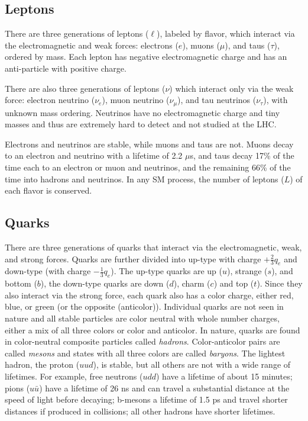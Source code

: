 \subsection{Leptons}
There are three generations of leptons ($\ell$), labeled by flavor, which interact via the electromagnetic and weak forces: electrons ($e$), muons ($\mu$), and taus ($\tau$), ordered by mass. Each lepton has negative electromagnetic charge and has an anti-particle with positive charge. 

There are also three generations of leptons ($\nu$) which interact only via the weak force: electron neutrino ($\nu_{e}$), muon neutrino ($\nu_{\mu}$), and tau neutrinos ($\nu_{\tau}$), with unknown mass ordering. Neutrinos have no electromagnetic charge and tiny masses and thus are extremely hard to detect and not studied at the \ac{LHC}. 

Electrons and neutrinos are stable, while muons and taus are not. Muons decay to an electron and neutrino with a lifetime of 2.2 $\mu$s, and taus decay 17\% of the time each to an electron or muon and neutrinos, and the remaining 66\% of the time into hadrons and neutrinos. In any \ac{SM} process, the number of leptons ($L$) of each flavor is conserved. 


\subsection{Quarks}
There are three generations of quarks that interact via the electromagnetic, weak, and strong forces. Quarks are further divided into up-type with charge $+\frac{2}{3}q_{e}$ and down-type (with charge $-\frac{1}{3}q_{e}$). The up-type quarks are up ($u$), strange ($s$), and bottom ($b$), the down-type quarks are down ($d$), charm ($c$) and top ($t$). Since they also interact via the strong force, each quark also has a color charge, either red, blue, or green (or the opposite (anticolor)). Individual quarks are not seen in nature and all stable particles are color neutral with whole number charges, either a mix of all three colors or color and anticolor. In nature, quarks are found in color-neutral composite particles called \emph{hadrons}. Color-anticolor pairs are called \emph{mesons} and states with all three colors are called \emph{baryons}. The lightest hadron, the proton ($uud$), is stable, but all others are not with a wide range of lifetimes. For example, free neutrons ($udd$) have a lifetime of about 15 minutes; pions ($u\bar{u}$) have a lifetime of 26 ns and can travel a substantial distance at the speed of light before decaying; b-mesons a lifetime of 1.5 ps and travel shorter distances if produced in collisions; all other hadrons have shorter lifetimes. 

